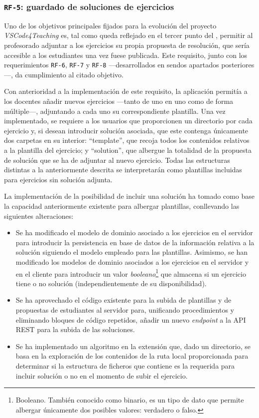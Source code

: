 \subsubsection{\texttt{RF-5}: guardado de soluciones de ejercicios}
\label{subsec:rf5}

Uno de los objetivos principales fijados para la evolución del proyecto \textit{VSCode4Teaching} es, tal como queda reflejado en el tercer punto del , permitir al profesorado adjuntar a los ejercicios su propia propuesta de resolución, que sería accesible a los estudiantes una vez fuese publicada. Este requisito, junto con los requerimientos \texttt{RF-6}, \texttt{RF-7} y \texttt{RF-8} ---desarrollados en sendos apartados posteriores---, da cumplimiento al citado objetivo.

Con anterioridad a la implementación de este requisito, la aplicación permitía a los docentes añadir nuevos ejercicios ---tanto de uno en uno como de forma múltiple---, adjuntando a cada uno su correspondiente plantilla. Una vez implementado, se requiere a los usuarios que proporcionen un directorio por cada ejercicio y, si desean introducir solución asociada, que este contenga únicamente dos carpetas en su interior: ``template'', que recoja todos los contenidos relativos a la plantilla del ejercicio; y ``solution'', que albergue la totalidad de la propuesta de solución que se ha de adjuntar al nuevo ejercicio. Todas las estructuras distintas a la anteriormente descrita se interpretarán como plantillas incluidas para ejercicios sin solución adjunta.

La implementación de la posibilidad de incluir una solución ha tomado como base la capacidad anteriormente existente para albergar plantillas, conllevando las siguientes alteraciones:
\begin{itemize}
    \item Se ha modificado el modelo de dominio asociado a los ejercicios en el servidor para introducir la persistencia en base de datos de la información relativa a la solución siguiendo el modelo empleado para las plantillas. Asimismo, se han modificado los modelos de dominio asociados a los ejercicios en el servidor y en el cliente para introducir un valor \textit{booleano}\footnote{Booleano. También conocido como binario, es un tipo de dato que permite albergar únicamente dos posibles valores: verdadero o falso.} que almacena si un ejercicio tiene o no solución (independientemente de su disponibilidad).
    \item Se ha aprovechado el código existente para la subida de plantillas y de propuestas de estudiantes al servidor para, unificando procedimientos y eliminando bloques de código repetidos, añadir un nuevo \textit{endpoint} a la API REST para la subida de las soluciones.
    \item Se ha implementado un algoritmo en la extensión que, dado un directorio, se basa en la exploración de los contenidos de la ruta local proporcionada para determinar si la estructura de ficheros que contiene es la requerida para incluir solución o no en el momento de subir el ejercicio.
\end{itemize}
